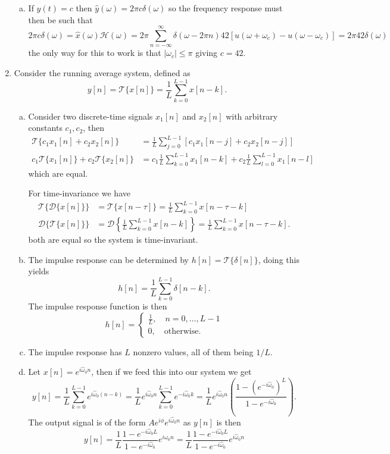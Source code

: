 \begin{enumerate}
\begin{enumerate}[a)]
\item If $y(t)=c$ then $\hat{y}(\omega)=2\pi c\delta(\omega)$ so the frequency response must then be such that
$$2\pi c\delta(\omega)=\hat{x}(\omega)\mathcal{H}(\omega)=2\pi\sum_{n=-\infty}^{\infty}\delta(\omega-2\pi n)42[u(\omega+\omega_{c})-u(\omega-\omega_{c})]=2\pi42\delta(\omega)$$
the only way for this to work is that $|\omega_{c}|\le\pi$ giving $c=42$. 
\end{enumerate}

\item Consider the running average system, defined as
$$y[n]=\mathcal{T}\{x[n]\}=\frac{1}{L}\sum_{k=0}^{L-1}x[n-k].$$

\begin{enumerate}[a)]
\item Consider two discrete-time signals $x_{1}[n]$ and $x_{2}[n]$ with arbitrary constants $c_{1},c_{2}$, then
\begin{align*}
    \mathcal{T}\{c_{1}x_{1}[n]+c_{2}x_{2}[n]\}&=\frac{1}{L}\sum_{j=0}^{L-1}[c_{1}x_{1}[n-j]+c_{2}x_{2}[n-j]] \\
    c_{1}\mathcal{T}\{x_{1}[n]\}+c_{2}\mathcal{T}\{x_{2}[n]\}&=c_{1}\frac{1}{L}\sum_{k=0}^{L-1}x_{1}[n-k]+c_{2}\frac{1}{L}\sum_{l=0}^{L-1}x_{1}[n-l]
\end{align*}
which are equal. 

For time-invariance we have
\begin{align*}
    \mathcal{T}\{\mathcal{D}\{x[n]\}\}&=\mathcal{T}\{x[n-\tau]\}=\frac{1}{L}\sum_{k=0}^{L-1}x[n-\tau-k] \\
    \mathcal{D}\{\mathcal{T}\{x[n]\}\}&=\mathcal{D}\left\{\frac{1}{L}\sum_{k=0}^{L-1}x[n-k]\right\}=\frac{1}{L}\sum_{k=0}^{L-1}x[n-\tau-k].
\end{align*}
both are equal so the system is time-invariant. 

\item The impulse response can be determined by $h[n]=\mathcal{T}\{\delta[n]\}$, doing this yields
$$h[n]=\frac{1}{L}\sum_{k=0}^{L-1}\delta[n-k].$$
The impulse response function is then
$$h[n]=\begin{cases}
    \frac{1}{L}, \quad n=0,\hdots,L-1 \\
    0, \quad \text{otherwise}.
\end{cases}$$

\item The impulse response has $L$ nonzero values, all of them being $1/L$. 

\item Let $x[n]=e^{i\hat{\omega}_{0}n}$, then if we feed this into our system we get
$$y[n]=\frac{1}{L}\sum_{k=0}^{L-1}e^{i\hat{\omega}_{0}(n-k)}=\frac{1}{L}e^{i\hat{\omega}_{0}n}\sum_{k=0}^{L-1}e^{-i\hat{\omega}_{0}k}=\frac{1}{L}e^{i\hat{\omega}_{0}n}\left(\frac{1-(e^{-i\hat{\omega}_{0}})^{L}}{1-e^{-i\hat{\omega}_{0}}}\right).$$
The output signal is of the form $Ae^{i\phi}e^{i\hat{\omega}_{0}n}$ as $y[n]$ is then
$$y[n]=\frac{1}{L}\frac{1-e^{-i\hat{\omega}_{0}L}}{1-e^{-i\hat{\omega}_{0}}}e^{i\hat{\omega}_{0}n}=\frac{1}{L}\frac{1-e^{-i\hat{\omega}_{0}L}}{1-e^{-i\hat{\omega}_{0}}}e^{i\hat{\omega}_{0}n}$$
\end{enumerate}


\end{enumerate}
